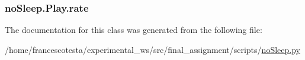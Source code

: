 \subsubsection[{\texorpdfstring{rate}{rate}}]{\setlength{\rightskip}{0pt plus 5cm}no\+Sleep.\+Play.\+rate}\hypertarget{classnoSleep_1_1Play_af1b7d964b638181e21fb682f418e6b6e}{}\label{classnoSleep_1_1Play_af1b7d964b638181e21fb682f418e6b6e}


The documentation for this class was generated from the following file\+:\begin{DoxyCompactItemize}
\item 
/home/francescotesta/experimental\+\_\+ws/src/final\+\_\+assignment/scripts/\hyperlink{noSleep_8py}{no\+Sleep.\+py}\end{DoxyCompactItemize}
